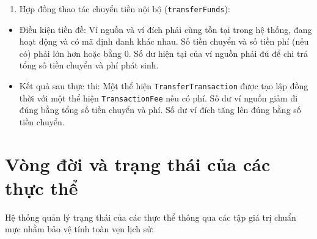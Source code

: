 \documentclass[a4paper,12pt]{report}
\providecommand{\tightlist}{%
  \setlength{\itemsep}{0pt}\setlength{\parskip}{0pt}}
\newcommand{\passthrough}[1]{#1}
\begin{document}
\begin{enumerate}
\def\labelenumi{\arabic{enumi}.}
\setcounter{enumi}{1}
\tightlist
\item
  Hợp đồng thao tác chuyển tiền nội bộ
  (\passthrough{\lstinline!transferFunds!}):
\end{enumerate}

\begin{itemize}
\tightlist
\item
  Điều kiện tiền đề: Ví nguồn và ví đích phải cùng tồn tại trong hệ
  thống, đang hoạt động và có mã định danh khác nhau. Số tiền chuyển và
  số tiền phí (nếu có) phải lớn hơn hoặc bằng 0. Số dư hiện tại của ví
  nguồn phải đủ để chi trả tổng số tiền chuyển và phí phát sinh.
\item
  Kết quả sau thực thi: Một thể hiện
  \passthrough{\lstinline!TransferTransaction!} được tạo lập đồng thời
  với một thể hiện \passthrough{\lstinline!TransactionFee!} nếu có phí.
  Số dư ví nguồn giảm đi đúng bằng tổng số tiền chuyển và phí. Số dư ví
  đích tăng lên đúng bằng số tiền chuyển.
\end{itemize}

\section{Vòng đời và trạng thái của các thực
thể}\label{vuxf2ng-ux111ux1eddi-vuxe0-trux1ea1ng-thuxe1i-cux1ee7a-cuxe1c-thux1ef1c-thux1ec3}

Hệ thống quản lý trạng thái của các thực thể thông qua các tập giá trị
chuẩn mực nhằm bảo vệ tính toàn vẹn lịch sử:
\end{document}
